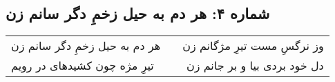 \begin{center}
\section*{شماره ۴: هر دم به حیل زخمِ دگر سانم زن}
\label{sec:004}
\begin{longtable}{l p{0.5cm} r}
هر دم به حیل زخمِ دگر سانم زن
&&
وز نرگسِ مست تیرِ مژگانم زن
\\
تیرِ مژه چون کشیدهای در رویم
&&
دل خود بردی بیا و بر جانم زن
\\
\end{longtable}
\end{center}
